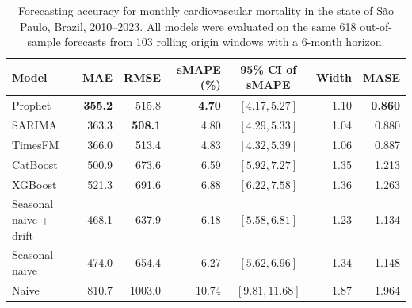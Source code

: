 \begin{table}[htbp]
\centering
\small
\setlength{\tabcolsep}{5pt}
\caption{Forecasting accuracy for monthly cardiovascular mortality in the state of
S\~ao Paulo, Brazil, 2010--2023. All models were evaluated on the same
618 out-of-sample forecasts from 103 rolling origin windows with a
6-month horizon.}
\label{tab:desempenho}
\begin{tabular}{lrrrcrr}
\toprule
Model & MAE & RMSE & sMAPE (\%) & 95\% CI of sMAPE & Width & MASE \\
\midrule
Prophet & \textbf{355.2} & 515.8 & \textbf{4.70} & $[4.17, 5.27]$ & 1.10 & \textbf{0.860} \\
SARIMA & 363.3 & \textbf{508.1} & 4.80 & $[4.29, 5.33]$ & 1.04 & 0.880 \\
TimesFM & 366.0 & 513.4 & 4.83 & $[4.32, 5.39]$ & 1.06 & 0.887 \\
CatBoost & 500.9 & 673.6 & 6.59 & $[5.92, 7.27]$ & 1.35 & 1.213 \\
XGBoost & 521.3 & 691.6 & 6.88 & $[6.22, 7.58]$ & 1.36 & 1.263 \\
\midrule
Seasonal naive + drift & 468.1 & 637.9 & 6.18 & $[5.58, 6.81]$ & 1.23 & 1.134 \\
Seasonal naive & 474.0 & 654.4 & 6.27 & $[5.62, 6.96]$ & 1.34 & 1.148 \\
Naive & 810.7 & 1003.0 & 10.74 & $[9.81, 11.68]$ & 1.87 & 1.964 \\
\bottomrule
\end{tabular}


\end{table}
